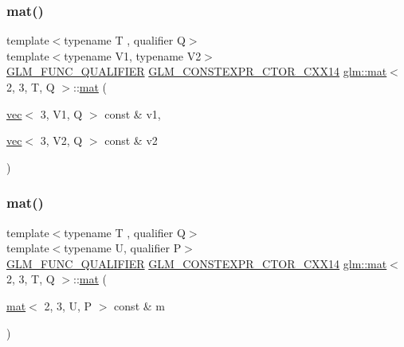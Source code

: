 \mbox{\label{structglm_1_1mat_3_012_00_013_00_01_t_00_01_q_01_4_a3e0d4479b6a5787d1d6116514c10cb0b}} 
\subsubsection{\texorpdfstring{mat()}{mat()}\hspace{0.1cm}{\footnotesize\ttfamily [20/21]}}
{\footnotesize\ttfamily template$<$typename T , qualifier Q$>$ \\
template$<$typename V1, typename V2$>$ \\
\hyperlink{setup_8hpp_a33fdea6f91c5f834105f7415e2a64407}{G\+L\+M\+\_\+\+F\+U\+N\+C\+\_\+\+Q\+U\+A\+L\+I\+F\+I\+ER} \hyperlink{setup_8hpp_a0900f9145e68bf6061b6f5e7be3fa751}{G\+L\+M\+\_\+\+C\+O\+N\+S\+T\+E\+X\+P\+R\+\_\+\+C\+T\+O\+R\+\_\+\+C\+X\+X14} \hyperlink{structglm_1_1mat}{glm\+::mat}$<$ 2, 3, T, Q $>$\+::\hyperlink{structglm_1_1mat}{mat} (\begin{DoxyParamCaption}\item[{\hyperlink{structglm_1_1vec}{vec}$<$ 3, V1, Q $>$ const \&}]{v1,  }\item[{\hyperlink{structglm_1_1vec}{vec}$<$ 3, V2, Q $>$ const \&}]{v2 }\end{DoxyParamCaption})}

\mbox{\label{structglm_1_1mat_3_012_00_013_00_01_t_00_01_q_01_4_a6cbdbc4b3a71c347e4d695c9db686054}} 
\subsubsection{\texorpdfstring{mat()}{mat()}\hspace{0.1cm}{\footnotesize\ttfamily [21/21]}}
{\footnotesize\ttfamily template$<$typename T , qualifier Q$>$ \\
template$<$typename U, qualifier P$>$ \\
\hyperlink{setup_8hpp_a33fdea6f91c5f834105f7415e2a64407}{G\+L\+M\+\_\+\+F\+U\+N\+C\+\_\+\+Q\+U\+A\+L\+I\+F\+I\+ER} \hyperlink{setup_8hpp_a0900f9145e68bf6061b6f5e7be3fa751}{G\+L\+M\+\_\+\+C\+O\+N\+S\+T\+E\+X\+P\+R\+\_\+\+C\+T\+O\+R\+\_\+\+C\+X\+X14} \hyperlink{structglm_1_1mat}{glm\+::mat}$<$ 2, 3, T, Q $>$\+::\hyperlink{structglm_1_1mat}{mat} (\begin{DoxyParamCaption}\item[{\hyperlink{structglm_1_1mat}{mat}$<$ 2, 3, U, P $>$ const \&}]{m }\end{DoxyParamCaption})}



